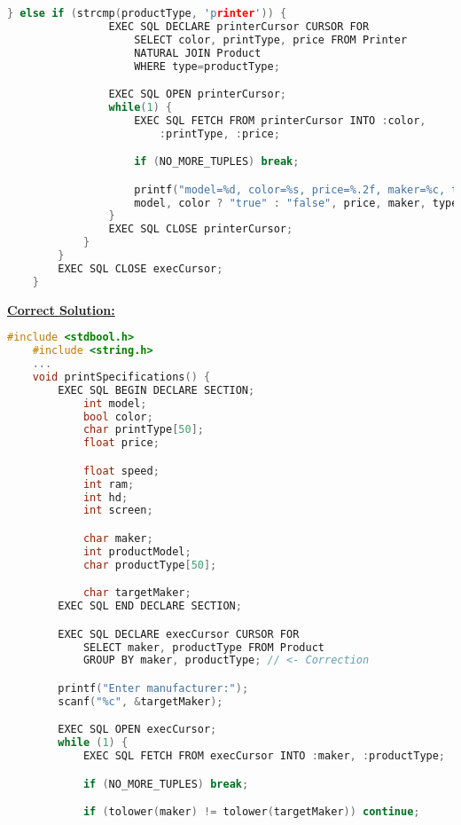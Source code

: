 \documentclass[12pt]{article}
\begin{document}
\begin{enumerate}[1.]
\begin{enumerate}[a)]
\begin{lstlisting}[language=c]
            } else if (strcmp(productType, 'printer')) {
                EXEC SQL DECLARE printerCursor CURSOR FOR
                    SELECT color, printType, price FROM Printer
                    NATURAL JOIN Product
                    WHERE type=productType;

                EXEC SQL OPEN printerCursor;
                while(1) {
                    EXEC SQL FETCH FROM printerCursor INTO :color,
                        :printType, :price;

                    if (NO_MORE_TUPLES) break;

                    printf("model=%d, color=%s, price=%.2f, maker=%c, type=%s",
                    model, color ? "true" : "false", price, maker, type);
                }
                EXEC SQL CLOSE printerCursor;
            }
        }
        EXEC SQL CLOSE execCursor;
    }
    \end{lstlisting}

        \bigskip

    \begin{mdframed}
        \underline{\textbf{Correct Solution:}}

        \bigskip

    \begin{lstlisting}[language=c]
    #include <stdbool.h>
    #include <string.h>
    ...
    void printSpecifications() {
        EXEC SQL BEGIN DECLARE SECTION;
            int model;
            bool color;
            char printType[50];
            float price;

            float speed;
            int ram;
            int hd;
            int screen;

            char maker;
            int productModel;
            char productType[50];

            char targetMaker;
        EXEC SQL END DECLARE SECTION;

        EXEC SQL DECLARE execCursor CURSOR FOR
            SELECT maker, productType FROM Product
            GROUP BY maker, productType; // <- Correction

        printf("Enter manufacturer:");
        scanf("%c", &targetMaker);

        EXEC SQL OPEN execCursor;
        while (1) {
            EXEC SQL FETCH FROM execCursor INTO :maker, :productType;

            if (NO_MORE_TUPLES) break;

            if (tolower(maker) != tolower(targetMaker)) continue;


\end{lstlisting}
\end{mdframed}
\end{enumerate}
\end{enumerate}
\end{document}
